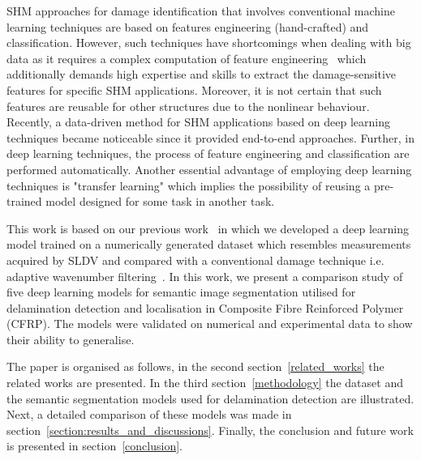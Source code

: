 SHM approaches for damage identification that involves conventional machine learning techniques are based on features engineering (hand-crafted) and classification.
However, such techniques have shortcomings when dealing with big data as it requires a complex computation of feature engineering~\cite{Gulgec2019} which additionally demands high expertise and skills to extract the damage-sensitive features for specific SHM applications.
Moreover, it is not certain that such features are reusable for
other structures due to the nonlinear behaviour.
Recently, a data-driven method for SHM applications based on deep learning techniques became noticeable since it provided end-to-end approaches.
Further, in deep learning techniques, the process of feature engineering and classification are performed automatically.
Another essential advantage of employing deep learning techniques is "transfer learning" which implies the possibility of reusing a pre-trained model designed for some task in another task.

This work is based on our previous work~\cite{Ijjeh2021} in which we developed a deep learning model trained on a numerically generated dataset which resembles measurements acquired by SLDV and compared with a conventional damage technique i.e. adaptive wavenumber filtering~\cite{Kudela2015, Radzienski2019a}.
In this work, we present a comparison study of five deep learning models for semantic image segmentation utilised for delamination detection and localisation in Composite Fibre Reinforced Polymer (CFRP).
The models were validated on numerical and experimental data to show their ability to generalise.          


The paper is organised as follows, in the second section~\ref{related_works} the related works are presented.
In the third section~\ref{methodology} the dataset and the semantic segmentation models used for delamination detection are illustrated. 
Next, a detailed comparison of these models was made in section~\ref{section:results_and_discussions}.
Finally, the conclusion and future work is presented in section~\ref{conclusion}.